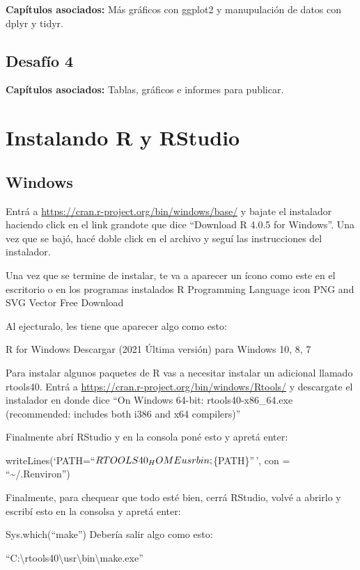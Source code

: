 \documentclass[
  openany]{book}
\begin{document}
\textbf{Capítulos asociados:} Más gráficos con ggplot2 y manupulación de datos con dplyr y tidyr.

\hypertarget{desafuxedo-4}{%
\section{Desafío 4}\label{desafuxedo-4}}

\textbf{Capítulos asociados:} Tablas, gráficos e informes para publicar.

\hypertarget{appendix-apuxe9ndice}{%
\appendix}


\hypertarget{instalando-r-y-rstudio}{%
\chapter{Instalando R y RStudio}\label{instalando-r-y-rstudio}}

\hypertarget{windows}{%
\section{Windows}\label{windows}}

Entrá a \url{https://cran.r-project.org/bin/windows/base/} y bajate el instalador haciendo click en el link grandote que dice ``Download R 4.0.5 for Windows''. Una vez que se bajó, hacé doble click en el archivo y seguí las instrucciones del instalador.

Una vez que se termine de instalar, te va a aparecer un ícono como este en el escritorio o en los programas instalados R Programming Language icon PNG and SVG Vector Free Download

Al ejecturalo, les tiene que aparecer algo como esto:

R for Windows Descargar (2021 Última versión) para Windows 10, 8, 7

Para instalar algunos paquetes de R vas a necesitar instalar un adicional llamado rtools40. Entrá a \url{https://cran.r-project.org/bin/windows/Rtools/} y descargate el instalador en donde dice ``On Windows 64-bit: rtools40-x86\_64.exe (recommended: includes both i386 and x64 compilers)''

Finalmente abrí RStudio y en la consola poné esto y apretá enter:

writeLines(`PATH=``\({RTOOLS40_HOME}\\usr\\bin;\)\{PATH\}''\,', con = ``\textasciitilde/.Renviron'')

Finalmente, para chequear que todo esté bien, cerrá RStudio, volvé a abrirlo y escribí esto en la consolsa y apretá enter:

Sys.which(``make'')
Debería salir algo como esto:

``C:\textbackslash rtools40\textbackslash usr\textbackslash bin\textbackslash make.exe''
\end{document}
